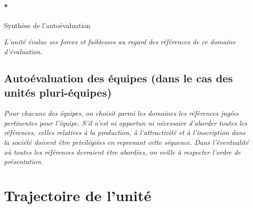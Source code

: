 \documentclass[]{article}
\let\oldparagraph\paragraph
\renewcommand{\paragraph}[1]{\oldparagraph{#1}\mbox{}}
\newcommand{\instructions}[1]{{\em \color{hceresgreen}#1}}
\begin{document}
\paragraph*{Synthèse de l'autoévaluation}

\instructions{L’unité évalue ses forces et faiblesses au regard des références de ce domaine d’évaluation.}

\subsection{Autoévaluation des équipes (dans le cas des unités
pluri-équipes)}

\instructions{Pour chacune des équipes, on choisit parmi les domaines les références jugées pertinentes pour l’équipe. S’il n’est ni opportun ni nécessaire d’aborder toutes les références, celles relatives à la production, à l’attractivité et à l’inscription dans la société doivent être privilégiées en reprenant cette séquence.
Dans l’éventualité où toutes les références devraient être abordées, on veille à respecter l’ordre de présentation.}

\section{Trajectoire de l'unité}
\end{document}
